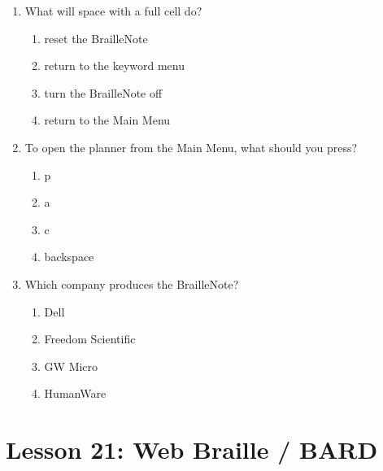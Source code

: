 \documentclass[10pt,letterpaper,twoside]{report}
\begin{document}
{{{{\begin{enumerate}
\begin{enumerate}
		            
	      \end{enumerate}
	\item What will space with a full cell do?
	      
	      \begin{enumerate}
		      \item reset the BrailleNote
		            
		      \item return to the keyword menu
		            
		      \item turn the BrailleNote off
		            
		      \item return to the Main Menu
		            
		            
	      \end{enumerate}
	\item To open the planner from the Main Menu, what should you press?
	      
	      \begin{enumerate}
		      \item p
		            
		      \item a
		            
		      \item c
		            
		      \item backspace
		            
		            
	      \end{enumerate}
	\item Which company produces the BrailleNote?
	      
	      \begin{enumerate}
		      \item Dell
		            
		      \item Freedom Scientific
		            
		      \item GW Micro
		            
		      \item HumanWare
	      \end{enumerate}
\end{enumerate}

\section*{Lesson 21: Web Braille / BARD}


}}}}
\end{document}
